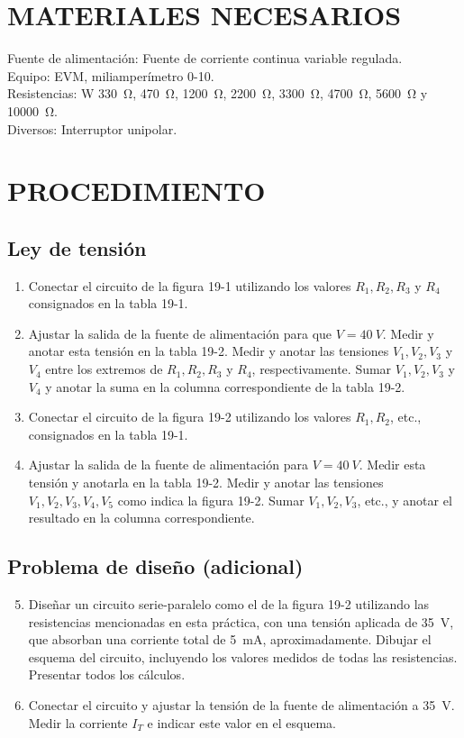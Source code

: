 \documentclass{article}
\begin{document}
\section{MATERIALES NECESARIOS}
Fuente de alimentación: Fuente de corriente continua variable regulada. \\
Equipo: EVM, miliamperímetro 0-10. \\
Resistencias: \textonehalf{} W \SI{330}{\ohm}, \SI{470}{\ohm}, \SI{1200}{\ohm}, \SI{2200}{\ohm}, \SI{3300}{\ohm}, \SI{4700}{\ohm}, \SI{5600}{\ohm} y \SI{10000}{\ohm}. \\
Diversos: Interruptor unipolar.

\section{PROCEDIMIENTO}
\subsection{Ley de tensión}
\begin{enumerate}
    \item Conectar el circuito de la figura 19-1 utilizando los valores $R_1, R_2, R_3$ y $R_4$ consignados en la tabla 19-1.
    \item Ajustar la salida de la fuente de alimentación para que $V = \SI{40}{V}$. Medir y anotar esta tensión en la tabla 19-2. Medir y anotar las tensiones $V_1, V_2, V_3$ y $V_4$ entre los extremos de $R_1, R_2, R_3$ y $R_4$, respectivamente. Sumar $V_1, V_2, V_3$ y $V_4$ y anotar la suma en la columna correspondiente de la tabla 19-2.
    \item Conectar el circuito de la figura 19-2 utilizando los valores $R_1, R_2$, etc., consignados en la tabla 19-1.
    \item Ajustar la salida de la fuente de alimentación para $V = \SI{40}{V}$. Medir esta tensión y anotarla en la tabla 19-2. Medir y anotar las tensiones $V_1, V_2, V_3, V_4, V_5$ como indica la figura 19-2. Sumar $V_1, V_2, V_3$, etc., y anotar el resultado en la columna correspondiente.
\end{enumerate}

\subsection{Problema de diseño (adicional)}
\begin{enumerate}
    \setcounter{enumi}{4}
    \item Diseñar un circuito serie-paralelo como el de la figura 19-2 utilizando las resistencias mencionadas en esta práctica, con una tensión aplicada de \SI{35}{V}, que absorban una corriente total de \SI{5}{mA}, aproximadamente. Dibujar el esquema del circuito, incluyendo los valores medidos de todas las resistencias. Presentar todos los cálculos.
    \item Conectar el circuito y ajustar la tensión de la fuente de alimentación a \SI{35}{V}. Medir la corriente $I_T$ e indicar este valor en el esquema.
\end{enumerate}
\end{document}

